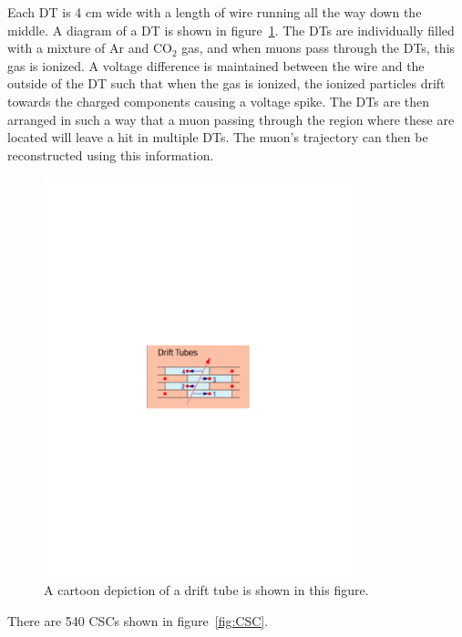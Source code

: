 Each DT is 4 cm wide with a length of wire running all the way down the middle.
A diagram of a DT is shown in figure~\ref{fig:DT}.
The DTs are individually filled with a mixture of Ar and $\mathrm{CO_{2}}$ gas, and when muons pass through the DTs, this gas is ionized.
A voltage difference is maintained between the wire and the outside of the DT such that when the gas is ionized,
the ionized particles drift towards the charged components causing a voltage spike.
The DTs are then arranged in such a way that a muon passing through the region where these are located will leave a hit in multiple DTs.
The muon's trajectory can then be reconstructed using this information.

\begin{figure}[!htb]
  \begin{center}
    \includegraphics[width=0.8\textwidth]{cms/figs/DT.pdf}
    \caption{
      \label{fig:DT}
      A cartoon depiction of a drift tube is shown in this figure. 
    }
  \end{center}
\end{figure}

There are 540 CSCs shown in figure~\ref{fig:CSC}.

